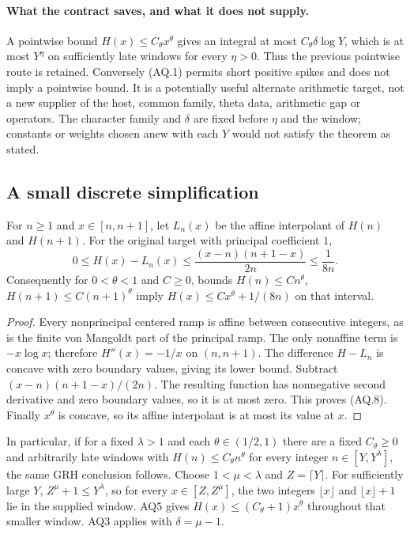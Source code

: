 \paragraph{What the contract saves, and what it does not supply.}
A pointwise bound $H(x)\le C_\theta x^\theta$ gives an integral
at most $C_\theta\delta\log Y$, which is at most $Y^\eta$ on
sufficiently late windows for every $\eta>0$.  Thus the previous
pointwise route is retained.  Conversely (AQ.1) permits short
positive spikes and does not imply a pointwise bound.  It is a
potentially useful alternate arithmetic target, not a new supplier
of the host, common family, theta data, arithmetic gap or operators.
The character family and $\delta$ are fixed before $\eta$ and the
window; constants or weights chosen anew with each $Y$ would not
satisfy the theorem as stated.

\subsection{A small discrete simplification}

\begin{lemma}
\label{claim:AQ5}
For $n\ge1$ and $x\in[n,n+1]$, let $L_n(x)$ be the affine
interpolant of $H(n)$ and $H(n+1)$.  For the original target with
principal coefficient $1$,
\[
 0\le H(x)-L_n(x)
       \le\frac{(x-n)(n+1-x)}{2n}\le\frac1{8n}.
 \tag{AQ.8}
\]
Consequently for $0<\theta<1$ and $C\ge0$, bounds
$H(n)\le Cn^\theta$, $H(n+1)\le C(n+1)^\theta$ imply
$H(x)\le Cx^\theta+1/(8n)$ on that interval.
\end{lemma}
\begin{proof}
Every nonprincipal centered ramp is affine between consecutive
integers, as is the finite von Mangoldt part of the principal
ramp.  The only nonaffine term is $-x\log x$; therefore
$H''(x)=-1/x$ on $(n,n+1)$.  The difference $H-L_n$ is concave
with zero boundary values, giving its lower bound.  Subtract
$(x-n)(n+1-x)/(2n)$.  The resulting function has nonnegative
second derivative and zero boundary values, so it is at most
zero.  This proves (AQ.8).  Finally $x^\theta$ is concave, so its
affine interpolant is at most its value at $x$.
\end{proof}

In particular, if for a fixed $\lambda>1$ and each
$\theta\in(1/2,1)$ there are a fixed $C_\theta\ge0$ and arbitrarily
late windows with $H(n)\le C_\theta n^\theta$ for every integer
$n\in[Y,Y^\lambda]$, the same GRH conclusion follows.  Choose
$1<\mu<\lambda$ and $Z=\lceil Y\rceil$.  For sufficiently large
$Y$, $Z^\mu+1\le Y^\lambda$, so for every $x\in[Z,Z^\mu]$,
the two integers $\lfloor x\rfloor$ and $\lfloor x\rfloor+1$
lie in the supplied window.
AQ5 gives $H(x)\le(C_\theta+1)x^\theta$ throughout that smaller
window.  AQ3 applies with $\delta=\mu-1$.

